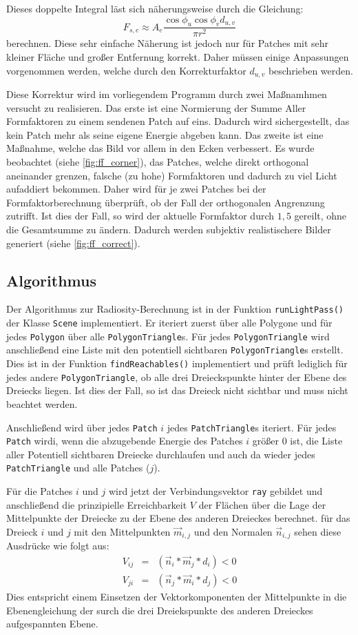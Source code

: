 \documentclass[final,a4paper,11pt,notitlepage,halfparskip]{scrreprt}
\begin{document}
Dieses doppelte Integral läst sich näherungsweise durch die Gleichung:
$$F_{s,e} \approx A_e \frac{\cos\phi_u\cos\phi_v d_{u,v}}{\pi r^2}$$
berechnen. Diese sehr einfache Näherung ist jedoch nur für Patches mit sehr
kleiner Fläche und großer Entfernung korrekt. Daher müssen einige Anpassungen
vorgenommen werden, welche durch den Korrekturfaktor $d_{u,v}$ beschrieben
werden.

Diese Korrektur wird im vorliegendem Programm durch zwei Maßnamhmen versucht zu
realisieren. Das erste ist eine Normierung der Summe Aller Formfaktoren zu einem
sendenen Patch auf eins. Dadurch wird sichergestellt, das kein Patch mehr als
seine eigene Energie abgeben kann. Das zweite ist eine Maßnahme, welche das Bild
vor allem in den Ecken verbessert. Es wurde beobachtet (siehe \ref{fig:ff_corner}), 
das Patches, welche direkt orthogonal aneinander grenzen, falsche (zu hohe) 
Formfaktoren und dadurch zu viel Licht aufaddiert bekommen. Daher wird für je
zwei Patches bei der Formfaktorberechnung überprüft, ob der Fall der
orthogonalen Angrenzung zutrifft. Ist dies der Fall, so wird der aktuelle
Formfaktor durch $1,5$ gereilt, ohne die Gesamtsumme zu ändern. Dadurch werden
subjektiv realistischere Bilder generiert (siehe \ref{fig:ff_correct}). 

\subsection{Algorithmus}
Der Algorithmus zur Radiosity-Berechnung ist in der Funktion
\texttt{runLightPass()} der Klasse \texttt{Scene} implementiert. Er iteriert 
zuerst über alle Polygone und für jedes \texttt{Polygon} über alle 
\texttt{PolygonTriangle}s. Für jedes \texttt{PolygonTriangle} wird 
anschließend eine Liste mit den potentiell sichtbaren \texttt{PolygonTriangle}s
erstellt. Dies ist in der Funktion \texttt{findReachables()} implementiert und
prüft lediglich für jedes andere \texttt{PolygonTriangle}, ob alle drei 
Dreieckspunkte hinter der Ebene des Dreiecks liegen. Ist dies der Fall, so ist 
das Dreieck nicht sichtbar und muss nicht beachtet werden.

Anschließend wird über jedes \texttt{Patch} $i$ jedes \texttt{PatchTriangle}s
iteriert. Für jedes \texttt{Patch} wirdi, wenn die abzugebende Energie des
Patches $i$ größer $0$ ist, die Liste aller Potentiell sichtbaren
Dreiecke durchlaufen und auch da wieder jedes \texttt{PatchTriangle} und alle
Patches ($j$). 

Für die Patches $i$ und $j$ wird jetzt der Verbindungsvektor \texttt{ray}
gebildet und anschließend die prinzipielle Erreichbarkeit $V$ der Flächen 
über die Lage der Mittelpunkte der Dreiecke zu der Ebene des anderen Dreieckes 
berechnet. für das Dreieck $i$ und $j$ mit den Mittelpunkten $\vec{m}_{i,j}$ und
den Normalen $\vec{n}_{i,j}$ sehen diese Ausdrücke wie folgt aus:
\begin{eqnarray*}
  V_{ij} &=& (\vec{n}_i * \vec{m}_j * d_i) < 0\\
  V_{ji} &=& (\vec{n}_j * \vec{m}_i * d_j) < 0   
\end{eqnarray*}
Dies entspricht einem Einsetzen der Vektorkomponenten der Mittelpunkte in die
Ebenengleichung der surch die drei Dreiekspunkte des anderen Dreieckes
aufgespannten Ebene.
\end{document}
